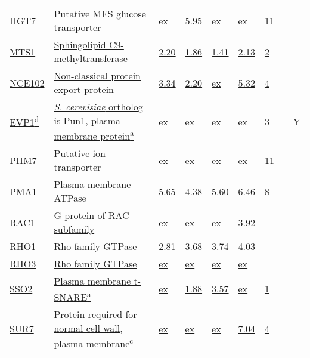 \begin{ThreePartTable}
\begin{longtable}[t]{lllllllll}
\hspace{1em}HGT7 & Putative MFS glucose transporter & ex & 5.95 & ex & ex & 11 &  & \\
\hspace{1em}\underline{MTS1} & \underline{Sphingolipid C9-methyltransferase} & \underline{2.20} & \underline{1.86} & \underline{1.41} & \underline{2.13} & \underline{2} & \underline{} & \underline{}\\
\hspace{1em}\underline{NCE102} & \underline{Non-classical protein export protein} & \underline{3.34} & \underline{2.20} & \underline{ex} & \underline{5.32} & \underline{4} & \underline{} & \underline{}\\
\hspace{1em}\underline{EVP1\textsuperscript{d}} & \underline{\textit{S. cerevisiae} ortholog is Pun1, plasma membrane protein\textsuperscript{a}} & \underline{ex} & \underline{ex} & \underline{ex} & \underline{ex} & \underline{3} & \underline{} & \underline{Y}\\
\hspace{1em}PHM7 & Putative ion transporter & ex & ex & ex & ex & 11 &  & \\
\hspace{1em}PMA1 & Plasma membrane ATPase & 5.65 & 4.38 & 5.60 & 6.46 & 8 &  & \\
\hspace{1em}\underline{RAC1} & \underline{G-protein of RAC subfamily} & \underline{ex} & \underline{ex} & \underline{ex} & \underline{3.92} & \underline{} & \underline{} & \underline{}\\
\hspace{1em}\underline{RHO1} & \underline{Rho family GTPase} & \underline{2.81} & \underline{3.68} & \underline{3.74} & \underline{4.03} & \underline{} & \underline{} & \underline{}\\
\hspace{1em}\underline{RHO3} & \underline{Rho family GTPase} & \underline{ex} & \underline{ex} & \underline{ex} & \underline{ex} & \underline{} & \underline{} & \underline{}\\
\hspace{1em}\underline{SSO2} & \underline{Plasma membrane t-SNARE\textsuperscript{a}} & \underline{ex} & \underline{1.88} & \underline{3.57} & \underline{ex} & \underline{1} & \underline{} & \underline{}\\
\hspace{1em}\underline{SUR7} & \underline{Protein required for normal cell wall, plasma membrane\textsuperscript{c}} & \underline{ex} & \underline{ex} & \underline{ex} & \underline{7.04} & \underline{4} & \underline{} & \underline{}\\

\end{longtable}
\end{ThreePartTable}
